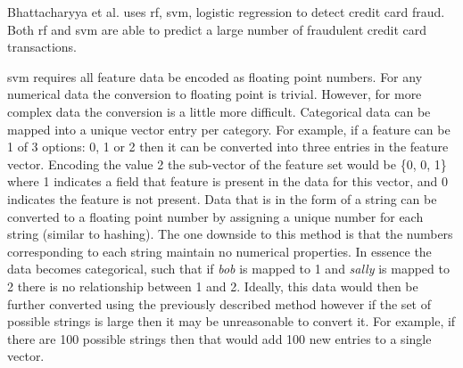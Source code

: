 Bhattacharyya et al. uses \gls{rf}, \gls{svm}, logistic regression to detect credit card fraud. Both \gls{rf} and \gls{svm} are able to predict a large number of fraudulent credit card transactions.



        

\gls{svm} requires all feature data be encoded as floating point numbers. For any numerical data the conversion to floating point is trivial. However, for more complex data the conversion is a little more difficult. Categorical data can be mapped into a unique vector entry per category. For example, if a feature can be 1 of 3 options: 0, 1 or 2 then it can be converted into three entries in the feature vector. Encoding the value 2 the sub-vector of the feature set would be \{0, 0, 1\} where 1 indicates a field that feature is present in the data for this vector, and 0 indicates the feature is not present. Data that is in the form of a string can be converted to a floating point number by assigning a unique number for each string (similar to hashing). The one downside to this method is that the numbers corresponding to each string maintain no numerical properties. In essence the data becomes categorical, such that if \textit{bob} is mapped to 1 and \textit{sally} is mapped to 2 there is no relationship between 1 and 2. Ideally, this data would then be further converted using the previously described method however if the set of possible strings is large then it may be unreasonable to convert it. For example, if there are 100 possible strings then that would add 100 new entries to a single vector.

